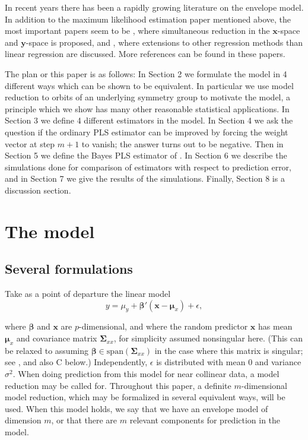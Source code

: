 \documentclass[a4paper, 11pt]{article}
\begin{document}
In recent years there has been a rapidly growing literature on the envelope model. In addition to the maximum likelihood estimation paper mentioned above, the most important papers seem to be \citet{cook2015simultaneous}, where simultaneous reduction in the $\bm{x}$-space and $\bm{y}$-space is proposed, and \citet{cook2015foundations}, where extensions to other regression methods than linear regression are discussed. More references can be found in these papers.

The plan or this paper is as follows: In Section 2 we formulate the model in 4 different ways which can be shown to be equivalent. In particular we use model reduction to orbits of an underlying symmetry group to motivate the model, a principle which we show has many other reasonable statistical applications. In Section 3 we define 4 different estimators in the model. In Section 4 we ask the question if the ordinary PLS estimator can be improved by forcing the weight vector at step $m+1$ to vanish; the answer turns out to be negative. Then in Section 5 we define the Bayes PLS estimator of \citet{helland2012near}. In Section 6 we describe the simulations done for comparison of estimators with respect to prediction error, and in Section 7 we give the results of the simulations. Finally, Section 8 is a discussion section.

\section{The model}

\subsection{Several formulations}

Take as a point of departure the linear model
\begin{equation}
  \label{model}
  y=\mu_{y}+\bm{\beta}'(\bm{x}-\bm{\mu}_{x})+\epsilon,
\end{equation}

where $\bm{\beta}$ and $\bm{x}$ are $p$-dimensional, and where the random predictor $\bm{x}$ has mean $\bm{\mu}_{x}$ and covariance matrix $\bm{\Sigma}_{xx}$, for simplicity assumed nonsingular here. (This can be relaxed to assuming $\bm{\beta}\in\mathrm{span}(\bm{\Sigma}_{xx})$ in the case where this matrix is singular; see \citet{cook2013envelopes}, and also C below.) Independently, $\epsilon$ is distributed with mean $0$ and variance $\sigma^2$. When doing prediction from this model for near collinear data, a model reduction may be called for. Throughout this paper, a definite $m$-dimensional model reduction, which may be formalized in several equivalent ways, will be used. When this model holds, we say that we have an envelope model of dimension $m$, or that there are $m$ relevant components for prediction in the model. \smallskip
\end{document}
